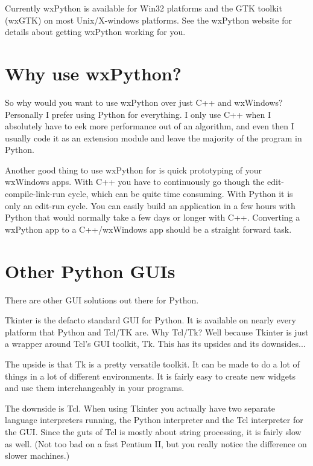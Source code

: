 Currently wxPython is available for Win32 platforms and the GTK
toolkit (wxGTK) on most Unix/X-windows platforms. See the wxPython
website  for
details about getting wxPython working for you.

\section{Why use wxPython?}\label{wxpwhy}

So why would you want to use wxPython over just C++ and wxWindows?
Personally I prefer using Python for everything. I only use C++ when I
absolutely have to eek more performance out of an algorithm, and even
then I usually code it as an extension module and leave the majority
of the program in Python.

Another good thing to use wxPython for is quick prototyping of your
wxWindows apps. With C++ you have to continuously go though the
edit-compile-link-run cycle, which can be quite time consuming. With
Python it is only an edit-run cycle. You can easily build an
application in a few hours with Python that would normally take a few
days or longer with C++. Converting a wxPython app to a C++/wxWindows app
should be a straight forward task.

\section{Other Python GUIs}\label{wxpother}

There are other GUI solutions out there for Python.


Tkinter is the defacto standard GUI for Python. It is available
on nearly every platform that Python and Tcl/TK are. Why Tcl/Tk?
Well because Tkinter is just a wrapper around Tcl's GUI toolkit, Tk.
This has its upsides and its downsides...

The upside is that Tk is a pretty versatile toolkit. It can be made
to do a lot of things in a lot of different environments. It is fairly
easy to create new widgets and use them interchangeably in your
programs.

The downside is Tcl. When using Tkinter you actually have two
separate language interpreters running, the Python interpreter and the
Tcl interpreter for the GUI. Since the guts of Tcl is mostly about
string processing, it is fairly slow as well. (Not too bad on a fast
Pentium II, but you really notice the difference on slower machines.)

